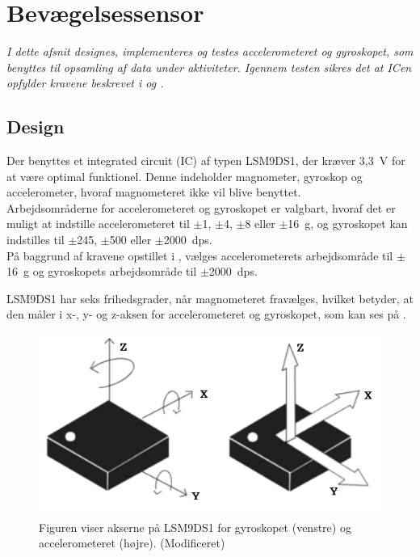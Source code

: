 \section{Bevægelsessensor}\label{sec_design_LSM9DS1}
\textit{I dette afsnit designes, implementeres og testes accelerometeret og gyroskopet, som benyttes til opsamling af data under aktiviteter. Igennem testen sikres det at ICen opfylder kravene beskrevet i  og .}

\subsection{Design} \label{design_lsm}
Der benyttes et integrated circuit (IC) af typen LSM9DS1, der kræver 3,3~V for at være optimal funktionel. Denne indeholder magnometer, gyroskop og accelerometer, hvoraf magnometeret ikke vil blive benyttet. \\ 
Arbejdsområderne for accelerometeret og gyroskopet er valgbart, hvoraf det er muligt at indstille accelerometeret til $\pm$1, $\pm$4, $\pm$8 eller $\pm$16~g, og gyroskopet kan indstilles til $\pm$245, $\pm$500 eller $\pm$2000~dps. \citep{Jimb02016,STMicroelectronics2016} \\
På baggrund af kravene opstillet i , vælges accelerometerets arbejdsområde til $\pm$16~g og gyroskopets arbejdsområde til $\pm$2000~dps. 

LSM9DS1 har seks frihedsgrader, når magnometeret fravælges, hvilket betyder, at den måler i x-, y- og z-aksen for accelerometeret og gyroskopet, som kan ses på . %
\citep{STMicroelectronics2016}\newline 
\begin{figure}[H]
	\centering
	\includegraphics[scale=0.4]{figures/cDesign/LSM9DS1.png}
	\caption{Figuren viser akserne på LSM9DS1 for gyroskopet (venstre) og accelerometeret (højre). \citep{Jimb02016} (Modificeret)}
	\label{vores_IC}
\end{figure}


